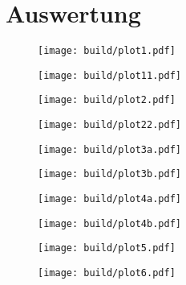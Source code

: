 \section{Auswertung}
\label{sec:auswertung}

\begin{figure}[H]
	\texttt{[image: build/plot1.pdf]}
\end{figure}

\begin{figure}[H]
	\texttt{[image: build/plot11.pdf]}
\end{figure}

\begin{figure}[H]
	\texttt{[image: build/plot2.pdf]}
\end{figure}

\begin{figure}[H]
	\texttt{[image: build/plot22.pdf]}
\end{figure}

\begin{figure}[H]
	\texttt{[image: build/plot3a.pdf]}
\end{figure}

\begin{figure}[H]
	\texttt{[image: build/plot3b.pdf]}
\end{figure}

\begin{figure}[H]
	\texttt{[image: build/plot4a.pdf]}
\end{figure}

\begin{figure}[H]
	\texttt{[image: build/plot4b.pdf]}
\end{figure}

\begin{figure}[H]
	\texttt{[image: build/plot5.pdf]}
\end{figure}

\begin{figure}[H]
	\texttt{[image: build/plot6.pdf]}
\end{figure}

